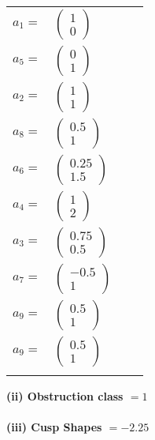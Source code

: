 \documentclass[1p]{elsarticle_modified}
\theoremstyle{definition}
\begin{document}
\begin{tabular}{m{7pt} m{180pt} m{7pt} m{180pt} }
\flushright $a_{1}=$&$\begin{pmatrix}1\\0\end{pmatrix}$ \\
\flushright $a_{5}=$&$\begin{pmatrix}0\\1\end{pmatrix}$ \\
\flushright $a_{2}=$&$\begin{pmatrix}1\\1\end{pmatrix}$ \\
\flushright $a_{8}=$&$\begin{pmatrix}0.5\\1\end{pmatrix}$ \\
\flushright $a_{6}=$&$\begin{pmatrix}0.25\\1.5\end{pmatrix}$ \\
\flushright $a_{4}=$&$\begin{pmatrix}1\\2\end{pmatrix}$ \\
\flushright $a_{3}=$&$\begin{pmatrix}0.75\\0.5\end{pmatrix}$ \\
\flushright $a_{7}=$&$\begin{pmatrix}-0.5\\1\end{pmatrix}$ \\
\flushright $a_{9}=$&$\begin{pmatrix}0.5\\1\end{pmatrix}$\\ \flushright $a_{9}=$&$\begin{pmatrix}0.5\\1\end{pmatrix}$\\&\end{tabular}
\flushleft \textbf{(ii) Obstruction class $= 1$}\\~\\
\flushleft \textbf{(iii) Cusp Shapes $= -2.25$}\\~\\
\end{document}
